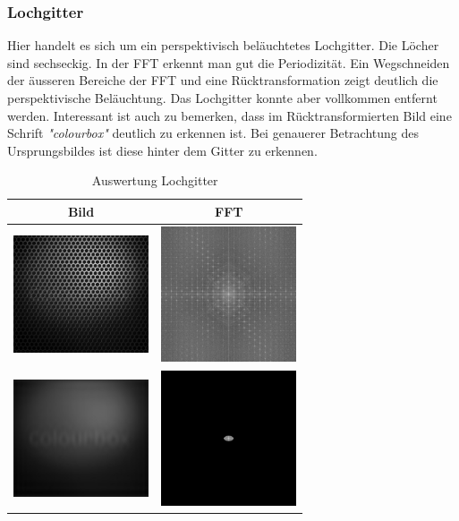 \documentclass[12pt,german]{article}
\begin{document}
\subsubsection{Lochgitter}
Hier handelt es sich um ein perspektivisch beläuchtetes Lochgitter. Die Löcher sind sechseckig. In der FFT erkennt man gut die Periodizität. Ein Wegschneiden der äusseren Bereiche der FFT und eine Rücktransformation zeigt deutlich die perspektivische Beläuchtung. Das Lochgitter konnte aber vollkommen entfernt werden. Interessant ist auch zu bemerken, dass im Rücktransformierten Bild eine Schrift \textit{"colourbox"} deutlich zu erkennen ist. Bei genauerer Betrachtung des Ursprungsbildes ist diese hinter dem Gitter zu erkennen.  
\begin{table}
  \centering
  \begin{tabular}{c | c}
    \hline
    Bild & FFT \\
    \hline
	\includegraphics[width=4cm]{../testData/Lochgitter.jpg} & \includegraphics[width=4cm]{../testData/Results/Lochgitter/FFT_of_Lochgitter.jpg} \\
    \hline
    \includegraphics[width=4cm]{../testData/Results/Lochgitter/reducedLochgitter.jpg} & \includegraphics[width=4cm]{../testData/Results/Lochgitter/reducedFFT_of_Lochgitter.jpg} \\
  \end{tabular}
  \caption{Auswertung Lochgitter}
  \label{tab:AuswertungLochgitter}
\end{table}
\end{document}
